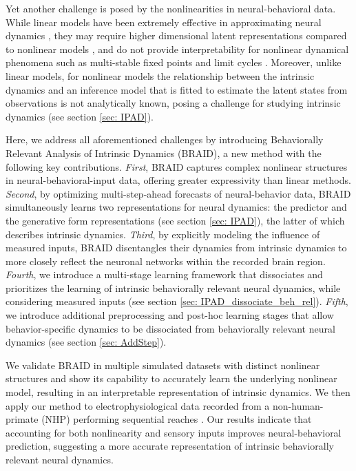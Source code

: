 \documentclass{article} %
\newcommand{\ourmethod}{BRAID}
\newcommand{\ourmethodfullname}{%
    {{B}ehaviorally {R}elevant {A}nalysis of {I}ntrinsic {D}ynamics}%
}
\begin{document}
Yet another challenge is posed by the nonlinearities in neural-behavioral data. While linear models have been extremely effective in approximating neural dynamics \citep{hastie2009elements, churchland2012neural, mante2013context, cunningham2014dimensionality, kao2015single, kobak2016demixed, abbaspourazad2021multiscale, sani2021modeling}, they may require higher dimensional latent representations compared to nonlinear models \citep{yang2019dynamic, nozari2024macroscopic,sani2024dissociative}, and do not provide interpretability for nonlinear dynamical phenomena such as multi-stable fixed points and limit cycles \citep{kim2021inferring, durstewitz2023reconstructing}. Moreover, unlike linear models, for nonlinear models the relationship between the intrinsic dynamics and an inference model that is fitted to estimate the latent states from observations is not analytically known, posing a challenge for studying intrinsic dynamics (see section \ref{sec: IPAD}). 

Here, we address all aforementioned challenges by introducing \ourmethodfullname{} (\ourmethod{}), a new method with the following key contributions.
\textit{First}, \ourmethod{} captures complex nonlinear structures in neural-behavioral-input data, offering greater expressivity than linear methods.  
\textit{Second}, by optimizing multi-step-ahead forecasts of neural-behavior data, \ourmethod{} simultaneously learns two representations for neural dynamics: the predictor and the generative form representations (see section \ref{sec: IPAD}), the latter of which describes intrinsic dynamics.
\textit{Third}, by explicitly modeling the influence of measured inputs, \ourmethod{} disentangles their dynamics from intrinsic dynamics to more closely reflect the neuronal networks within the recorded brain region.
\textit{Fourth}, we introduce a multi-stage learning framework that dissociates and prioritizes the learning of intrinsic behaviorally relevant neural dynamics, while considering measured inputs (see section \ref{sec: IPAD_dissociate_beh_rel}).
\textit{Fifth}, we introduce additional preprocessing and post-hoc learning stages that allow behavior-specific dynamics to be dissociated from behaviorally relevant neural dynamics (see section \ref{sec: AddStep}).

We validate \ourmethod{} in multiple simulated datasets with distinct nonlinear structures and show its capability to accurately learn the underlying nonlinear model, resulting in an interpretable representation of intrinsic dynamics. We then apply our method to electrophysiological data recorded from a non-human-primate (NHP) performing sequential reaches \citep{sabes}. Our results indicate that accounting for both nonlinearity and sensory inputs improves neural-behavioral prediction, suggesting a more accurate representation of intrinsic behaviorally relevant neural dynamics.
\end{document}
